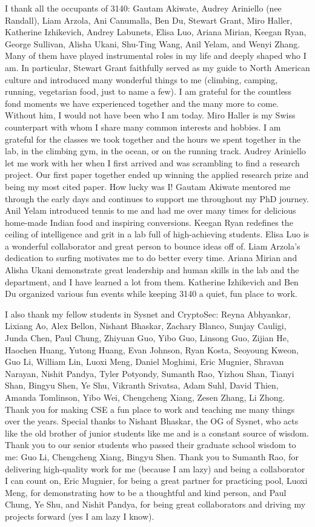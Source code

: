\documentclass[12pt]{ucsddissertation}
\begin{document}
\begin{acknowledgements}
I thank all the occupants of 3140: Gautam Akiwate, Audrey Ariniello (nee Randall), Liam Arzola, Ani Canumalla, Ben Du, Stewart Grant, Miro Haller, Katherine Izhikevich, Andrey Labunets, Elisa Luo, Ariana Mirian, Keegan Ryan, George Sullivan, Alisha Ukani, Shu-Ting Wang, Anil Yelam, and Wenyi Zhang.
Many of them have played instrumental roles in my life and deeply shaped who I am. In particular, Stewart Grant faithfully served as my guide to North American culture and introduced many wonderful things to me (climbing, camping, running, vegetarian food, just to name a few). I am grateful for the countless fond moments we have experienced together and the many more to come. Without him, I would not have been who I am today. Miro Haller is my Swiss counterpart with whom I share many common interests and hobbies. I am grateful for the classes we took together and the hours we spent together in the lab, in the climbing gym, in the ocean, or on the running track. Audrey Ariniello let me work with her when I first arrived and was scrambling to find a research project. Our first paper together ended up winning the applied research prize and being my most cited paper. How lucky was I! Gautam Akiwate mentored me through the early days and continues to support me throughout my PhD journey. Anil Yelam introduced tennis to me and had me over many times for delicious home-made Indian food and inspiring conversions. Keegan Ryan redefines the ceiling of intelligence and grit in a lab full of high-achieving students. Elisa Luo is a wonderful collaborator and great person to bounce ideas off of. Liam Arzola's dedication to surfing motivates me to do better every time. Ariana Mirian and Alisha Ukani demonstrate great leadership and human skills in the lab and the department, and I have learned a lot from them. Katherine Izhikevich and Ben Du organized various fun events while keeping 3140 a quiet, fun place to work.

I also thank my fellow students in Sysnet and CryptoSec:   Reyna Abhyankar, Lixiang Ao, Alex Bellon, Nishant Bhaskar, Zachary Blanco, Sunjay Cauligi, Junda Chen, Paul Chung, Zhiyuan Guo, Yibo Guo, Linsong Guo, Zijian He, Haochen Huang, Yutong Huang, Evan Johnson, Ryan Kosta, Seoyoung Kweon, Guo Li, William Lin, Luoxi Meng, Daniel Moghimi, Eric Mugnier, Shravan Narayan, Nishit Pandya, Tyler Potyondy, Sumanth Rao, Yizhou Shan, Tianyi Shan, Bingyu Shen, Ye Shu, Vikranth Srivatsa, Adam Suhl, David Thien, Amanda Tomlinson, Yibo Wei, Chengcheng Xiang, Zesen Zhang, Li Zhong. Thank you for making CSE a fun place to work and teaching me many things over the years. Special thanks to Nishant Bhaskar, the OG of Sysnet, who acts like the old brother of junior students like me and is a constant source of wisdom. Thank you to our senior students who passed their graduate school wisdom to me: Guo Li, Chengcheng Xiang, Bingyu Shen. Thank you to Sumanth Rao, for delivering high-quality work for me (because I am lazy) and being a collaborator I can count on, Eric Mugnier, for being a great partner for practicing pool, 
Luoxi Meng, for demonstrating how to be a thoughtful and kind person, and Paul Chung, Ye Shu, and Nishit Pandya, for being great collaborators and driving my projects forward (yes I am lazy I know).


\end{acknowledgements}
\end{document}
